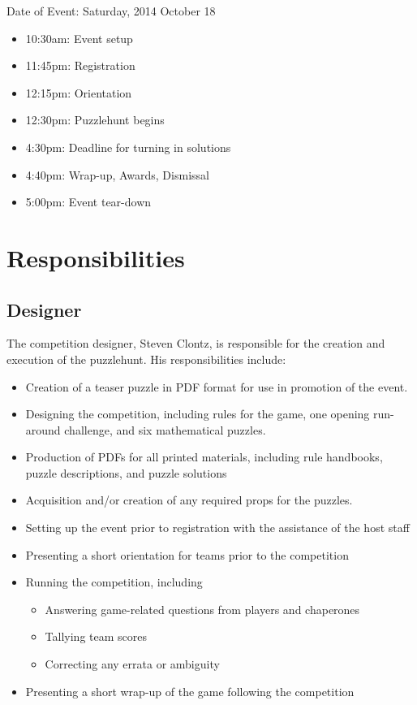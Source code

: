 \documentclass[11pt,letterpaper]{article}
\begin{document}
Date of Event: Saturday, 2014 October 18

\begin{itemize}
  \item 10:30am: Event setup
  \item 11:45pm: Registration
  \item 12:15pm: Orientation
  \item 12:30pm: Puzzlehunt begins
  \item 4:30pm: Deadline for turning in solutions
  \item 4:40pm: Wrap-up, Awards, Dismissal
  \item 5:00pm: Event tear-down
\end{itemize}



\newpage

\section{Responsibilities}

\subsection{Designer}

The competition designer, Steven Clontz, is responsible for the creation and
execution of the puzzlehunt. His responsibilities include:

\begin{itemize}
  \item Creation of a teaser puzzle in PDF format for use in promotion of
        the event.
  \item Designing the competition, including rules for the game, one
        opening run-around challenge, and six mathematical puzzles.
  \item Production of PDFs for all printed materials, including rule
        handbooks, puzzle descriptions, and puzzle solutions
  \item Acquisition and/or creation of any required props for the puzzles.
  \item Setting up the event prior to registration with the assistance
        of the host staff
  \item Presenting a short orientation for teams prior to the competition
  \item Running the competition, including
    \begin{itemize}
      \item Answering game-related questions from players and chaperones
      \item Tallying team scores
      \item Correcting any errata or ambiguity
    \end{itemize}
  \item Presenting a short wrap-up of the game following the competition
\end{itemize}
\end{document}
